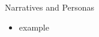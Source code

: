 \begin{Slide}{Narratives and Personas}
\begin{itemize}
\item \TODO example

\end{itemize}
\end{Slide}